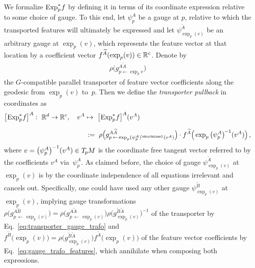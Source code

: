We formalize $\operatorname{Exp}^*_p\mkern-2mu f$ by defining it in terms of its coordinate expression relative to some choice of gauge.
To this end, let $\psi_p^A$ be a gauge at $p$, relative to which the transported features will ultimately be expressed and let $\psi_{\exp_p(v)}^{\widetilde{A}}$ be an arbitrary gauge at $\exp_p(v)$, which represents the feature vector at that location by a coefficient vector $f^{\widetilde{A}}(\exp_p(v)) \in \mathbb{R}^c$.
Denote by 
\begin{align}
    \rho \big( g^{A\widetilde{A}}_{p\leftarrow\exp_p\!v} \big)
\end{align}
the $G$-compatible parallel transporter of feature vector coefficients along the geodesic from $\exp_p(v)$ to~$p$.
Then we define the \emph{transporter pullback} in coordinates as%
\begin{align}\label{eq:transporter_pullback_in_coords}
    \big[\mkern-2mu \Expspf \big]^A:\ \R^d \to \R^c,\quad v^A &\mapsto\ \big[\mkern-2mu \Expspf \big]^A (v^A)
        \notag \\[1.5ex]
        & \,:=\ 
        \rho\pig( g^{A\widetilde{A}}_{p \,\leftarrow\, \exp_p (\psi_p^A)^{\shortminus1}(v^A)} \pig) \cdot
        f^{\widetilde{A}} \pig( \exp_p \big(\psi_p^A\big)^{\mkern-2mu-1}(v^A) \pig) \,,
\end{align}
where $v = \big(\psi_p^A\big)^{-1} (v^A) \in T_{\mkern-1.5mu p}\mkern-.5muM$ is the coordinate free tangent vector referred to by the coefficients $v^A$ via~$\psi_p^A$.
As claimed before, the choice of gauge $\psi_{\exp_p(v)}^{\widetilde{A}}$ at $\exp_p(v)$ is by the coordinate independence of all equations irrelevant and cancels out.
Specifically, one could have used any other gauge $\psi_{\exp_p(v)}^{\widetilde{B}}$ at $\exp_p(v)$, implying gauge transformations
$
    \rho\big( g^{A\widetilde{B}}_{p \,\leftarrow\, \exp_p(v)} \big)
  = \rho\big( g^{A\widetilde{A}}_{p \,\leftarrow\, \exp_p(v)} \big)
    \rho\big( g_{\exp_p(v)}^{\widetilde{B}\widetilde{A}} \big)^{-1}
$
of the transporter by Eq.~\eqref{eq:transporter_gauge_trafo} and
$
    f^{\widetilde{B}} \big( \exp_p(v) \big)
  = \rho\big( g_{\exp_p(v)}^{\widetilde{B}\widetilde{A}} \big)
    f^{\widetilde{A}} \big( \exp_p(v) \big)
$
of the feature vector coefficients by Eq.~\eqref{eq:gauge_trafo_features}, which annihilate when composing both expressions.


